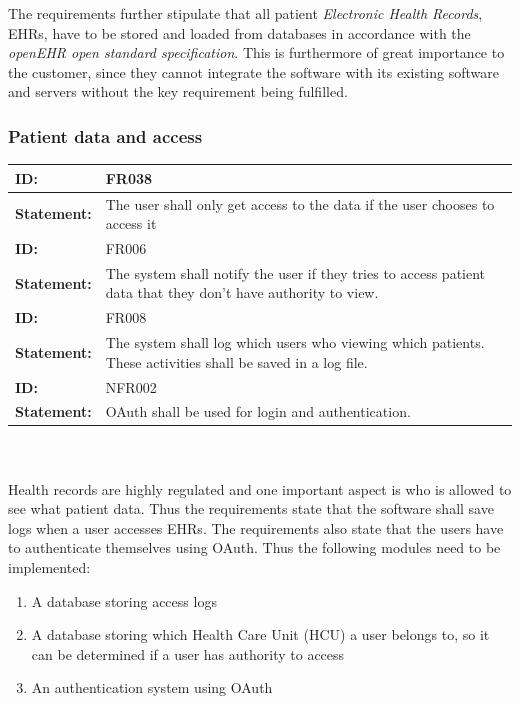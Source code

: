 \documentclass{article}
\begin{document}
The requirements further stipulate that all patient \emph{Electronic Health Records}, EHRs, have to be stored and loaded from databases in accordance with the \emph{openEHR open standard specification}. This is furthermore of great importance to the customer, since they cannot integrate the software with its existing software and servers without the key requirement being fulfilled.

\subsubsection{Patient data and access}

\begin{tabularx}{\linewidth}{| l | X |}
 \hline
 \textbf{ID:} & FR038  \\ 
 \hline
 \textbf{Statement:} & The user shall only get access to the data if the user chooses to access it
  \\ 
 \hline

 \textbf{ID:} & FR006  \\ 
 \hline
 \textbf{Statement:} & The system shall notify the user if they tries to access patient data that they don't have authority to view.\\ 
 \hline

 \textbf{ID:} & FR008  \\ 
 \hline
 \textbf{Statement:} & The system shall log which users who viewing which patients. These activities shall be saved in a log file.
\\ 
 \hline

 \textbf{ID:} & NFR002  \\ 
 \hline
 \textbf{Statement:} & OAuth shall be used for login and authentication.
 \\ 
 \hline
\end{tabularx}
\\ \\

Health records are highly regulated and one important aspect is who is allowed to see what patient data. Thus the requirements state that the software shall save logs when a user accesses EHRs. The requirements also state that the users have to authenticate themselves using OAuth. 
Thus the following modules need to be implemented:

\begin{enumerate}[label=(\roman*)]
\item A database storing access logs
\item A database storing which Health Care Unit (HCU) a user belongs to, so it can be determined if a user has authority to access
\item An authentication system using OAuth
\end{enumerate}
\end{document}
